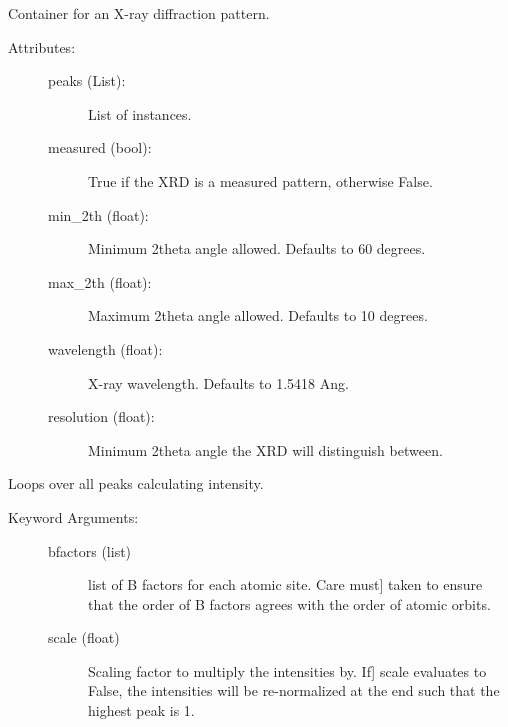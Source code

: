 \documentclass[letterpaper,10pt,english]{sphinxmanual}
\begin{document}
\begin{fulllineitems}
\label{models:qmpy.XRD}
Container for an X-ray diffraction pattern.
\begin{description}
\item[{Attributes:}] \leavevmode\begin{description}
\item[{peaks (List): }] \leavevmode
List of {\hyperref[models:qmpy.Peak]{}} instances.

\item[{measured (bool): }] \leavevmode
True if the XRD is a measured pattern, otherwise False.

\item[{min\_2th (float): }] \leavevmode
Minimum 2theta angle allowed. Defaults to 60 degrees.

\item[{max\_2th (float): }] \leavevmode
Maximum 2theta angle allowed. Defaults to 10 degrees.

\item[{wavelength (float): }] \leavevmode
X-ray wavelength. Defaults to 1.5418 Ang.

\item[{resolution (float): }] \leavevmode
Minimum 2theta angle the XRD will distinguish between.

\end{description}

\end{description}

\begin{fulllineitems}
\label{models:qmpy.XRD.get_intensities}
Loops over all peaks calculating intensity.
\begin{description}
\item[{Keyword Arguments:}] \leavevmode\begin{description}
\item[{bfactors (list)}] \leavevmode{[}list of B factors for each atomic site. Care must{]}
taken to ensure that the order of B factors agrees with the order
of atomic orbits.

\item[{scale (float)}] \leavevmode{[}Scaling factor to multiply the intensities by. If{]}
scale evaluates to False, the intensities will be re-normalized at
the end such that the highest peak is 1.


\end{description}
\end{description}
\end{fulllineitems}
\end{fulllineitems}
\end{document}

